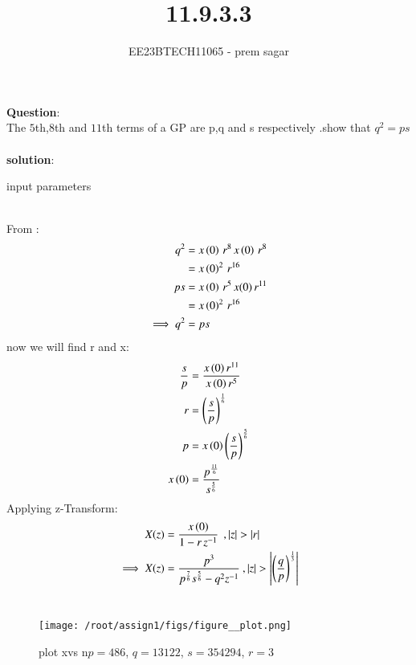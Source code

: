 \documentclass[journal,12pt,twocolumn]{IEEEtran}
\theoremstyle{remark}
\begin{document}

\vspace{3cm}

\title{11.9.3.3}
\author{EE23BTECH11065 - prem sagar}
\maketitle
\newpage

\bigskip 

\renewcommand{\thefigure}{\theenumi}
\renewcommand{\thetable}{\theenumi}
\textbf{Question}:\\ The $5$th,$8$th and $11$th terms of a GP are p,q and s respectively .show that $q^2=ps$
\\\\\textbf{solution}:
\begin{table}[!ht]
   \centering
    \renewcommand\thetable{1}
      
    \caption{input parameters}
    \label{tab:11.9.3}
 \end{table}
\\ From :
\begin{align}
q^2&=x\left(0\right)\,r^8\,x\left(0\right)\,r^8
     \\ &=x\left(0\right)^2\,r^{16}
\\ps&=x\left(0\right)\,r^5\,x(0)\,r^{11}
       \\&=x\left(0\right)^2\,r^{16}
\\\implies q^2&=ps
\end{align}
now we will find r and x:
\begin{align}
\frac{s}{p}&=\frac{x\left(0\right)r^{11}}{x\left(0\right)r^5}
\\r&=\left(\frac{s}{p}\right)^\frac{1}{6} 
\\p&=x\left(0\right)\left(\frac{s}{p}\right)^\frac{5}{6}
\\x\left(0\right)&=\frac{p^\frac{11}{6}}{s^\frac{5}{6}}
\end{align}
Applying z-Transform:
\begin{align}
     X(z) &= \frac{x\left(0\right)}{1-r\,z^{-1}}\: \:,\left\vert z\right\vert>\left\vert r\right\vert
\\ \implies  X(z)&=\frac{p^3}{p^\frac{7}{6}s^\frac{5}{6}-q^2z^{-1}}\:,\left\vert z\right\vert>\left\vert\left(\frac{q}{p}\right)^\frac{1}{3}\right\vert
     \end{align}    
\\\begin{figure}[h]
   \renewcommand\thefigure{1}
    \centering
    \texttt{[image: /root/assign1/figs/figure\_\_plot.png]}
    \caption{plot xvs n\hspace{0.1cm}$p=486$,
    \hspace{0.1cm}$q=13122$,
    \hspace{0.1cm}$s=354294$,
    \hspace{0.1cm}$r=3$}
    \label{fig:1}
\end{figure}\\
\end{document}
